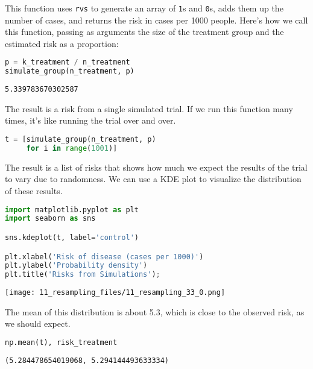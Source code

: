 This function uses \passthrough{\lstinline!rvs!} to generate an array of
\passthrough{\lstinline!1!}s and \passthrough{\lstinline!0!}s, adds them
up the number of cases, and returns the risk in cases per 1000 people.
Here's how we call this function, passing as arguments the size of the
treatment group and the estimated risk as a proportion:

\begin{lstlisting}[language=Python,style=source]
p = k_treatment / n_treatment
simulate_group(n_treatment, p)
\end{lstlisting}

\begin{lstlisting}[style=output]
5.339783670302587
\end{lstlisting}

The result is a risk from a single simulated trial. If we run this
function many times, it's like running the trial over and over.

\begin{lstlisting}[language=Python,style=source]
t = [simulate_group(n_treatment, p)
     for i in range(1001)]
\end{lstlisting}

The result is a list of risks that shows how much we expect the results
of the trial to vary due to randomness. We can use a KDE plot to
visualize the distribution of these results.

\begin{lstlisting}[language=Python,style=source]
import matplotlib.pyplot as plt
import seaborn as sns

sns.kdeplot(t, label='control')

plt.xlabel('Risk of disease (cases per 1000)')
plt.ylabel('Probability density')
plt.title('Risks from Simulations');
\end{lstlisting}

\begin{center}
\texttt{[image: 11\_resampling\_files/11\_resampling\_33\_0.png]}
\end{center}

The mean of this distribution is about 5.3, which is close to the
observed risk, as we should expect.

\begin{lstlisting}[language=Python,style=source]
np.mean(t), risk_treatment
\end{lstlisting}

\begin{lstlisting}[style=output]
(5.284478654019068, 5.294144493633334)
\end{lstlisting}

